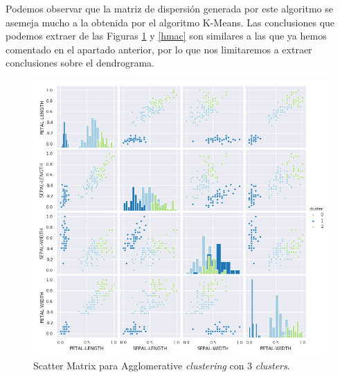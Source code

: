 \documentclass[a4paper, 20pt]{article}
\begin{document}
{Podemos observar que la matriz de dispersión generada por este algoritmo se asemeja mucho a la obtenida por el algoritmo K-Means. Las conclusiones que podemos extraer de las Figuras \ref{smac} y \ref{hmac} son similares a las que ya hemos comentado en el apartado anterior, por lo que nos limitaremos a extraer conclusiones sobre el dendrograma.

\clearpage

\begin{figure}[h]
\centering
\includegraphics[scale=0.64]{dani/scatmatrixAggClusterIRIS.png}
\caption{Scatter Matrix para Agglomerative \textit{clustering} con 3 \textit{clusters}.}
\label{smac}
\end{figure}

\clearpage

}
\end{document}
